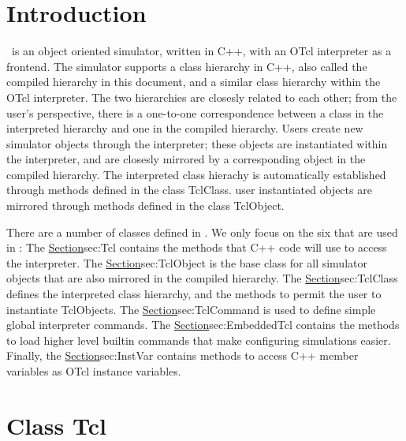\documentclass{article}
\begin{document}
\section{Introduction}
\ns\ is an object oriented simulator,
written in C++, with an OTcl interpreter as a frontend.
The simulator supports a class hierarchy in C++,
also called the compiled hierarchy in this document, 
and a similar class hierarchy within the OTcl interpreter.
The two hierarchies are closesly related to each other;
from the user's perspective,
there is a one-to-one correspondence
between a class in the interpreted hierarchy
and one in the compiled hierarchy.
Users create new simulator objects through the interpreter;
these objects are instantiated within the interpreter, 
and are closesly mirrored by a corresponding object
in the compiled hierarchy.
The interpreted class hierachy is automatically established through
methods defined in the class TclClass.
user instantiated objects are mirrored through methods
defined in the class TclObject.


There are a number of classes defined in \Tclf{}.
We only focus on the six that are used in \ns:
The \href{Class Tcl}{Section}{sec:Tcl} contains the methods that
C++ code will use to access the interpreter.
The \href{class TclObject}{Section}{sec:TclObject}
is the base class for all simulator objects that are also mirrored 
in the compiled hierarchy.
The \href{class TclClass}{Section}{sec:TclClass} defines
the interpreted class hierarchy, and 
the methods to permit the user to instantiate TclObjects.
The \href{class TclCommand}{Section}{sec:TclCommand}
is used to define simple global interpreter commands.
The \href{class EmbeddedTcl}{Section}{sec:EmbeddedTcl}
contains the methods to load higher level builtin commands
that make configuring simulations easier.
Finally, the \href{class InstVar}{Section}{sec:InstVar}
contains methods to access C++ member variables
as OTcl instance variables.

\section{Class Tcl}
\label{sec:Tcl}
\end{document}
